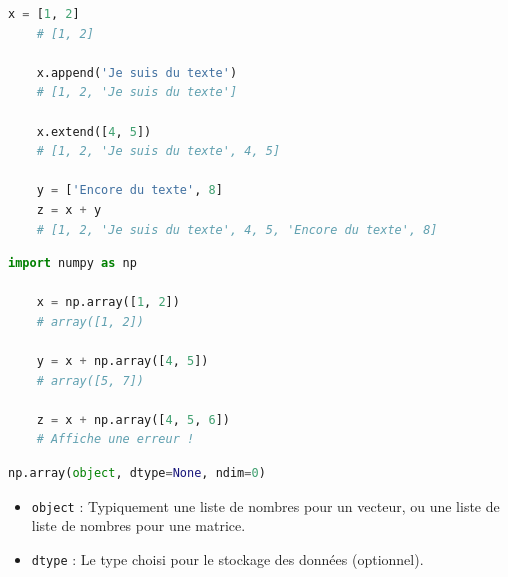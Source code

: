 \documentclass[aspectratio=169]{beamer}
\begin{document}
\begin{frame}[fragile]{}{}
  \vfill
  \begin{lstlisting}[language=Python]
    x = [1, 2]
    # [1, 2]

    x.append('Je suis du texte')
    # [1, 2, 'Je suis du texte']

    x.extend([4, 5])
    # [1, 2, 'Je suis du texte', 4, 5]

    y = ['Encore du texte', 8]
    z = x + y
    # [1, 2, 'Je suis du texte', 4, 5, 'Encore du texte', 8]
  \end{lstlisting}
  \vfill
\end{frame}





\begin{frame}[fragile]{}{}
  
\end{frame}





\begin{frame}[fragile]{}{}
  \vfill
  \begin{lstlisting}[language=Python]
    import numpy as np

    x = np.array([1, 2])
    # array([1, 2])

    y = x + np.array([4, 5])
    # array([5, 7])

    z = x + np.array([4, 5, 6])
    # Affiche une erreur !
  \end{lstlisting}
  \vfill
\end{frame}




\begin{frame}[fragile]{}{}

\end{frame}




\begin{frame}[fragile]{}{}
  \vfill
  \begin{lstlisting}[language=Python]
    np.array(object, dtype=None, ndim=0)
  \end{lstlisting}
  \begin{itemize}
  \item \texttt{object} : Typiquement une liste de nombres pour un vecteur, ou une liste de liste de nombres pour une matrice.

  \item \texttt{dtype} : Le type choisi pour le stockage des données (optionnel).
  \end{itemize}
  \vfill
\end{frame}
\end{document}
